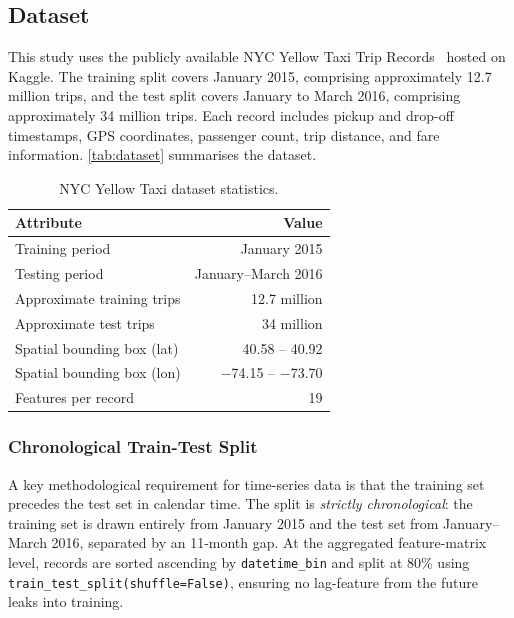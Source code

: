 \documentclass[a4paper,fleqn]{cas-dc}
\begin{document}
\subsection{Dataset}

This study uses the publicly available NYC Yellow Taxi Trip Records~\cite{taxinyc_dataset} hosted on Kaggle.  The training split covers January 2015, comprising approximately 12.7 million trips, and the test split covers January to March 2016, comprising approximately 34 million trips.  Each record includes pickup and drop-off timestamps, GPS coordinates, passenger count, trip distance, and fare information.  \autoref{tab:dataset} summarises the dataset.

\begin{table}[t]
\centering
\caption{NYC Yellow Taxi dataset statistics.\label{tab:dataset}}
\begin{tabularx}{\columnwidth}{>{\raggedright\arraybackslash}X r}
\toprule
\textbf{Attribute} & \textbf{Value} \\
\midrule
Training period & January 2015 \\
Testing period  & January--March 2016 \\
Approximate training trips & 12.7 million \\
Approximate test trips & 34 million \\
Spatial bounding box (lat) & 40.58 -- 40.92 \\
Spatial bounding box (lon) & $-$74.15 -- $-$73.70 \\
Features per record & 19 \\
\bottomrule
\end{tabularx}
\end{table}

\subsubsection{Chronological Train-Test Split}
A key methodological requirement for time-series data is that the training set precedes the test set in calendar time.  The split is \emph{strictly chronological}: the training set is drawn entirely from January 2015 and the test set from January--March 2016, separated by an 11-month gap.  At the aggregated feature-matrix level, records are sorted ascending by \texttt{datetime\_bin} and split at 80\% using \texttt{train\_test\_split(shuffle=False)}, ensuring no lag-feature from the future leaks into training.
\end{document}
